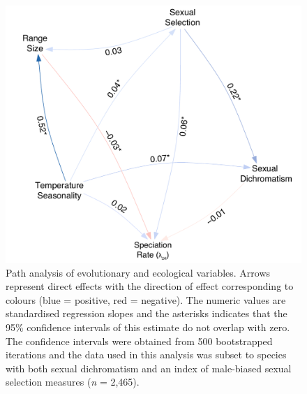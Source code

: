 \documentclass[]{article}
\begin{document}
\begin{figure}
\centering
\includegraphics{Figures/Path_Analysis.pdf}
\caption{Path analysis of evolutionary and ecological variables. Arrows
represent direct effects with the direction of effect corresponding to
colours (blue = positive, red = negative). The numeric values are
standardised regression slopes and the asterisks indicates that the 95\%
confidence intervals of this estimate do not overlap with zero. The
confidence intervals were obtained from 500 bootstrapped iterations and
the data used in this analysis was subset to species with both sexual
dichromatism and an index of male-biased sexual selection measures
(\emph{n} = 2,465). \label{Path_Analysis}}
\end{figure}
\end{document}
